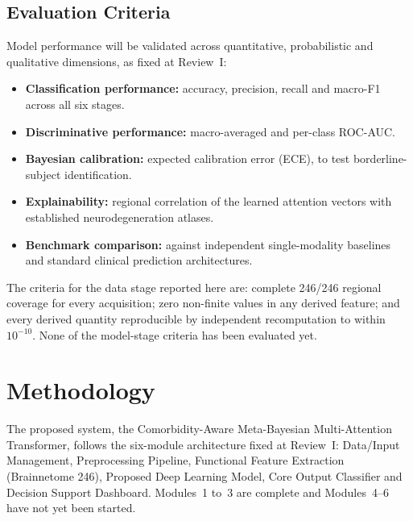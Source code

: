 \documentclass{ssnreview}
\begin{document}
\section{Evaluation Criteria}
Model performance will be validated across quantitative, probabilistic and qualitative
dimensions, as fixed at Review~I:
\begin{itemize}[leftmargin=2em]
  \item \textbf{Classification performance:} accuracy, precision, recall and macro-F1
        across all six stages.
  \item \textbf{Discriminative performance:} macro-averaged and per-class ROC-AUC.
  \item \textbf{Bayesian calibration:} expected calibration error (ECE), to test
        borderline-subject identification.
  \item \textbf{Explainability:} regional correlation of the learned attention vectors
        with established neurodegeneration atlases.
  \item \textbf{Benchmark comparison:} against independent single-modality baselines
        and standard clinical prediction architectures.
\end{itemize}
The criteria for the data stage reported here are: complete 246/246 regional coverage
for every acquisition; zero non-finite values in any derived feature; and every derived
quantity reproducible by independent recomputation to within $10^{-10}$. None of the
model-stage criteria has been evaluated yet.

\chapter{Methodology}\label{ch:method}

The proposed system, the Comorbidity-Aware Meta-Bayesian Multi-Attention Transformer,
follows the six-module architecture fixed at Review~I: Data/Input Management,
Preprocessing Pipeline, Functional Feature Extraction (Brainnetome 246), Proposed Deep
Learning Model, Core Output Classifier and Decision Support Dashboard. Modules~1 to~3
are complete and Modules~4--6 have not yet been started.
\end{document}
